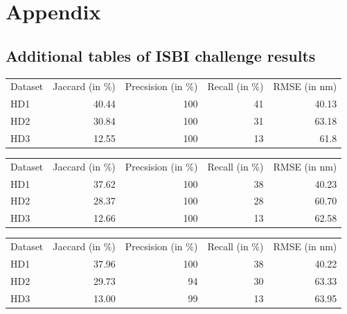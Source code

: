 \chapter{Appendix}


\listoffigures
\listoftables

\section{Additional tables of ISBI challenge results}

\begin{center}
\label{reshd1}%
\begin{tabular}{lrrrr}
Dataset&Jaccard (in \%)&Precsision (in \%)& Recall (in \%) & RMSE (in nm)\\
HD1&40.44&100&41&40.13\\
HD2&30.84&100&31&63.18\\
HD3&12.55&100&13&61.8
\end{tabular} 

\end{center}


\begin{center}
\label{reshd2}
\begin{tabular}{lrrrr}
Dataset&Jaccard (in \%)&Precsision (in \%)& Recall (in \%) & RMSE (in nm)\\
HD1&37.62&100&38&40.23\\
HD2&28.37&100&28&60.70\\
HD3&12.66&100&13&62.58
\end{tabular}
\end{center}

\begin{center}
\label{reshd3}
\begin{tabular}{lrrrr}
Dataset&Jaccard (in \%)&Precsision (in \%)& Recall (in \%) & RMSE (in nm)\\
HD1&37.96&100&38&40.22\\
HD2&29.73&94&30&63.33\\
HD3&13.00&99&13&63.95
\end{tabular}
\end{center}


